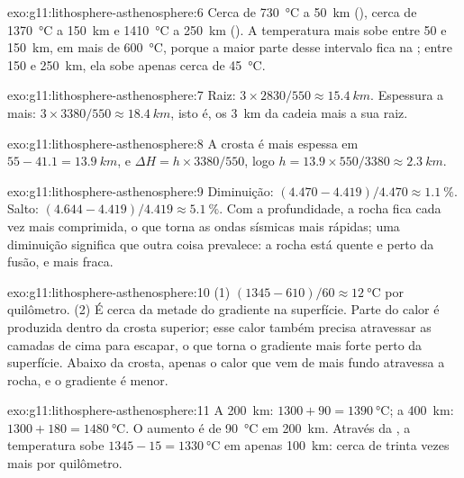 \begin{solution}{exo:g11:lithosphere-asthenosphere:6}
Cerca de \qty{730}{\celsius} a \qty{50}{km} (), cerca de
\qty{1370}{\celsius} a \qty{150}{km} e \qty{1410}{\celsius} a
\qty{250}{km} (). A temperatura mais sobe entre 50 e
\qty{150}{km}, em mais de \qty{600}{\celsius}, porque a maior parte desse
intervalo fica na ; entre 150 e \qty{250}{km}, ela sobe apenas
cerca de \qty{45}{\celsius}.
\end{solution}

\begin{solution}{exo:g11:lithosphere-asthenosphere:7}
Raiz: $3 \times 2830/550 \approx \qty{15.4}{km}$. Espessura a mais:
$3 \times 3380/550 \approx \qty{18.4}{km}$, isto é, os \qty{3}{km} da
cadeia mais a sua raiz.
\end{solution}

\begin{solution}{exo:g11:lithosphere-asthenosphere:8}
A crosta é mais espessa em $55 - 41.1 = \qty{13.9}{km}$, e $\Delta H = h
\times 3380/550$, logo $h = 13.9 \times 550/3380 \approx \qty{2.3}{km}$.
\end{solution}

\begin{solution}{exo:g11:lithosphere-asthenosphere:9}
Diminuição: $(4.470 - 4.419)/4.470 \approx \qty{1.1}{\percent}$. Salto:
$(4.644 - 4.419)/4.419 \approx \qty{5.1}{\percent}$. Com a profundidade, a
rocha fica cada vez mais comprimida, o que torna as ondas sísmicas mais
rápidas; uma diminuição significa que outra coisa prevalece: a rocha está
quente e perto da fusão, e mais fraca.
\end{solution}

\begin{solution}{exo:g11:lithosphere-asthenosphere:10}
(1) $(1345 - 610)/60 \approx \qty{12}{\celsius}$ por quilômetro. (2) É cerca
da metade do gradiente na superfície. Parte do calor é produzida dentro da
crosta superior; esse calor também precisa atravessar as camadas de cima
para escapar, o que torna o gradiente mais forte perto da superfície. Abaixo
da crosta, apenas o calor que vem de mais fundo atravessa a rocha, e o
gradiente é menor.
\end{solution}

\begin{solution}{exo:g11:lithosphere-asthenosphere:11}
A \qty{200}{km}: $1300 + 90 = \qty{1390}{\celsius}$; a \qty{400}{km}:
$1300 + 180 = \qty{1480}{\celsius}$. O aumento é de \qty{90}{\celsius} em
\qty{200}{km}. Através da , a temperatura sobe
$1345 - 15 = \qty{1330}{\celsius}$ em apenas \qty{100}{km}: cerca de trinta
vezes mais por quilômetro.
\end{solution}

